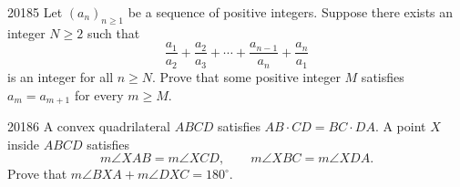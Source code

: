 \begin{problem}{2018}{5}
Let $(a_n)_{n\geq1}$ be a sequence of positive integers. Suppose there exists an integer $N\geq2$ such that
\[
    \frac{a_1}{a_2}+\frac{a_2}{a_3}+\cdots+\frac{a_{n-1}}{a_n}+\frac{a_n}{a_1}
\]
is an integer for all $n\geq N$. Prove that some positive integer $M$ satisfies $a_m=a_{m+1}$ for every $m\geq M$.
\end{problem}

\begin{problem}{2018}{6}
A convex quadrilateral $ABCD$ satisfies $AB\cdot CD=BC\cdot DA$. A point $X$ inside $ABCD$ satisfies
\[
    m\angle XAB=m\angle XCD, \qquad m\angle XBC=m\angle XDA.
\]
Prove that $m\angle BXA+m\angle DXC=180^\circ$.
\end{problem}

